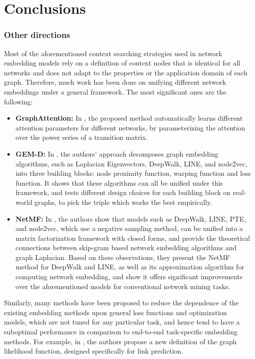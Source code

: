 \section{Conclusions}

\subsubsection*{Other directions}


Most of the aforementioned context searching strategies used in network embedding models rely on a definition of context nodes that is identical for all networks and does not adapt to the properties or the application domain of each graph. Therefore, much work has been done on unifying different network embeddings under a general framework. The most significant ones are the following:
\begin{itemize}
\item \textbf{GraphAttention:}
In \cite{velivckovic2017graph}, the proposed method automatically learns different attention parameters for different networks, by parameterizing the attention over the power series of a transition matrix.
\item \textbf{GEM-D:}
In \cite{chen2017fast}, the authors' approach decomposes graph embedding algorithms, such as Laplacian Eigenvectors, DeepWalk, LINE, and node2vec, into three building blocks: node proximity function, warping function and loss function. It shows that these algorithms can all be unified under this framework, and tests different design choices for each building block on real-world graphs, to pick the triple which works the best empirically.  
\item \textbf{NetMF:}
In \cite{Qiu:2018:NEM:3159652.3159706}, the authors show that models such as DeepWalk, LINE, PTE, and node2vec, which use a negative sampling method, can be unified into a matrix factorization framework with closed forms, and provide the theoretical connections between skip-gram based network embedding algorithms and graph Laplacian. Based on these observations, they present the NetMF method for DeepWalk and LINE, as well as its approximation algorithm for computing network embedding, and show it offers significant improvements over the aforementioned models for conventional network mining tasks.
\end{itemize}

Similarly, many methods have been proposed to reduce the dependence of the existing embedding methods upon general loss functions
and optimization models, which are not tuned for any particular task, and hence tend to have a suboptimal performance in comparison to end-to-end task-specific embedding methods. 
For example, in \cite{abu2017learning}, the authors propose a new definition of the graph likelihood function, designed specifically for link prediction.


